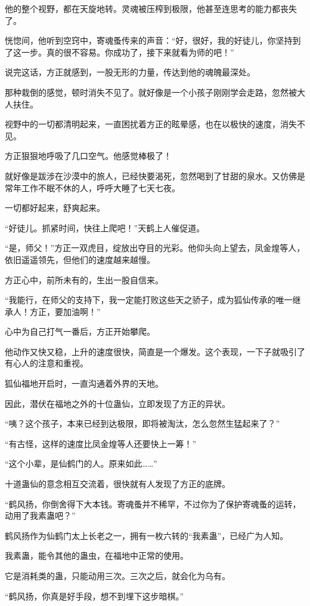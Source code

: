 \begin{this_body}
他的整个视野，都在天旋地转。灵魂被压榨到极限，他甚至连思考的能力都丧失了。

恍惚间，他听到空窍中，寄魂蚤传来的声音：“好，很好，我的好徒儿，你坚持到了这一步。真的很不容易。你成功了，接下来就看为师的吧！”

说完这话，方正就感到，一股无形的力量，传达到他的魂魄最深处。

那种栽倒的感觉，顿时消失不见了。就好像是一个小孩子刚刚学会走路，忽然被大人扶住。

视野中的一切都清明起来，一直困扰着方正的眩晕感，也在以极快的速度，消失不见。

方正狠狠地呼吸了几口空气。他感觉棒极了！

就好像是跋涉在沙漠中的旅人，已经快要渴死，忽然喝到了甘甜的泉水。又仿佛是常年工作不眠不休的人，呼呼大睡了七天七夜。

一切都好起来，舒爽起来。

“好徒儿。抓紧时间，快往上爬吧！”天鹤上人催促道。

“是，师父！”方正一双虎目，绽放出夺目的光彩。他仰头向上望去，凤金煌等人，依旧遥遥领先，但他们的速度越来越慢。

方正心中，前所未有的，生出一股自信来。

“我能行，在师父的支持下，我一定能打败这些天之骄子，成为狐仙传承的唯一继承人！方正，要加油啊！”

心中为自己打气一番后，方正开始攀爬。

他动作又快又稳，上升的速度很快，简直是一个爆发。这个表现，一下子就吸引了有心人的注意和重视。

狐仙福地开启时，一直沟通着外界的天地。

因此，潜伏在福地之外的十位蛊仙，立即发现了方正的异状。

“咦？这个孩子，本来已经到达极限，即将被淘汰，怎么忽然生猛起来了？”

“有古怪，这样的速度比凤金煌等人还要快上一筹！”

“这个小辈，是仙鹤门的人。原来如此……”

十道蛊仙的意念相互交流着，很快就有人发现了方正的底牌。

“鹤风扬，你倒舍得下大本钱。寄魂蚤并不稀罕，不过你为了保护寄魂蚤的运转，动用了我素蛊吧？”

鹤风扬作为仙鹤门太上长老之一，拥有一枚六转的“我素蛊”，已经广为人知。

我素蛊，能令其他的蛊虫，在福地中正常的使用。

它是消耗类的蛊，只能动用三次。三次之后，就会化为乌有。

“鹤风扬，你真是好手段，想不到埋下这步暗棋。”


\end{this_body}
